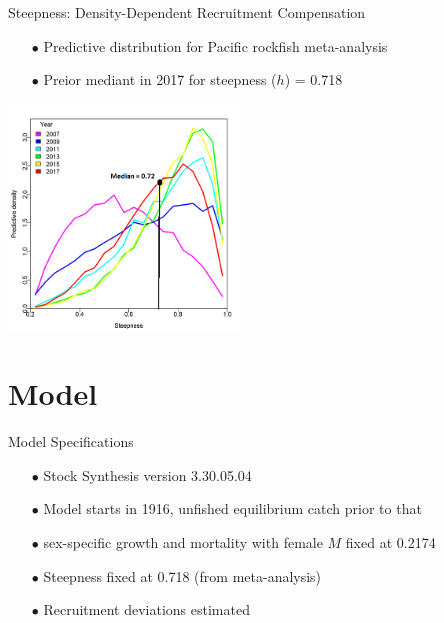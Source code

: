 \documentclass[ignorenonframetext,]{beamer}
\begin{document}
\begin{frame}{Steepness: Density-Dependent Recruitment Compensation}

\begin{itemize}
\item[$\bullet$] Predictive distribution for Pacific rockfish meta-analysis
\item[$\bullet$] Preior mediant in 2017 for steepness ($h$) = 0.718
\end{itemize}

\centering
\includegraphics[height=6cm]{Figures/h_prior.png}

\end{frame}

\section{Model}\label{model}

\begin{frame}{Model Specifications}

\begin{itemize}
\item[$\bullet$] Stock Synthesis version 3.30.05.04
\item[$\bullet$] Model starts in 1916, unfished equilibrium catch prior to that
\item[$\bullet$] sex-specific growth and mortality with female $M$ fixed at 0.2174
\item[$\bullet$] Steepness fixed at 0.718 (from meta-analysis)
\item[$\bullet$] Recruitment deviations estimated
\end{itemize}

\end{frame}
\end{document}
